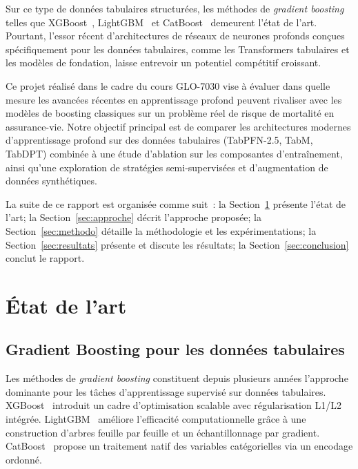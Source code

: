 \documentclass[conference]{IEEEtran}
\begin{document}
Sur ce type de données tabulaires structurées, les méthodes de \textit{gradient boosting}
telles que XGBoost~\cite{chen2016xgboost}, LightGBM~\cite{ke2017lightgbm} et CatBoost~\cite{prokhorenkova2018catboost} demeurent l'état de l'art. Pourtant, l'essor récent
d'architectures de réseaux de neurones profonds conçues spécifiquement pour les données
tabulaires, comme les Transformers tabulaires et les modèles de fondation, laisse
entrevoir un potentiel compétitif croissant.

Ce projet réalisé dans le cadre du cours GLO-7030 vise à évaluer dans quelle
mesure les avancées récentes en apprentissage profond peuvent rivaliser avec  les
modèles de boosting classiques sur un problème réel de risque de mortalité en assurance-vie. Notre objectif principal est de comparer les architectures modernes d'apprentissage profond sur des données tabulaires (TabPFN-2.5, TabM, TabDPT) combinée à une étude d'ablation sur les composantes d'entraînement, ainsi qu'une
exploration de stratégies semi-supervisées et d'augmentation de données synthétiques.

La suite de ce rapport est organisée comme suit~: la Section~\ref{sec:etat_art} présente
l'état de l'art; la Section~\ref{sec:approche} décrit l'approche proposée; la
Section~\ref{sec:methodo} détaille la méthodologie et les expérimentations; la
Section~\ref{sec:resultats} présente et discute les résultats; la Section~\ref{sec:conclusion}
conclut le rapport.

\section{État de l'art}
\label{sec:etat_art}

\subsection{Gradient Boosting pour les données tabulaires}

Les méthodes de \textit{gradient boosting} constituent depuis plusieurs années l'approche
dominante pour les tâches d'apprentissage supervisé sur données tabulaires. XGBoost~\cite{chen2016xgboost}
introduit un cadre d'optimisation scalable avec régularisation L1/L2 intégrée. LightGBM~\cite{ke2017lightgbm}
améliore l'efficacité computationnelle grâce à une construction d'arbres feuille par feuille
et un échantillonnage par gradient. CatBoost~\cite{prokhorenkova2018catboost} propose un
traitement natif des variables catégorielles via un encodage ordonné.
\end{document}
